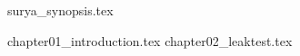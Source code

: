 \documentclass[a4paper,12pt,twoside,openany]{book}
\begin{document}
\newpage

\fancyhead[LE,RO]{\thepage}


{surya_synopsis.tex}

\cleardoublepage

\newpage
\fancyhead[LO]{\leftmark}
\fancyhead[RE]{\rightmark}
\fancyhead[LE,RO]{\thepage}

\normalsize

{chapter01_introduction.tex}
\cleardoublepage
{chapter02_leaktest.tex}


\newpage
{}



\end{document}
